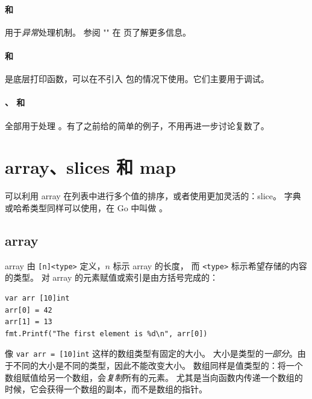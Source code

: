 \paragraph{ 和 } 用于\emph{异常}处理机制。
参阅 "" 在 \pageref{sec:panic} 页了解更多信息。

\paragraph{ 和 } 是底层打印函数，可以在不引入
 包的情况下使用。它们主要用于调试。

\paragraph{、 和 } 全部用于处理
。有了之前给的简单的例子，不用再进一步讨论复数了。


\section{array、slices 和 map}
\label{sec:arrays}
可以利用 array 在列表中进行多个值的排序，或者使用更加灵活的：slice。
字典或哈希类型同样可以使用，在 Go 中叫做 。

\subsection{array}
array 由 \verb|[n]<type>| 定义，$n$ 标示 array 的长度，
而 \verb|<type>| 标示希望存储的内容的类型。
对 array 的元素赋值或索引是由方括号完成的：
\begin{lstlisting}
var arr [10]int
arr[0] = 42
arr[1] = 13
fmt.Printf("The first element is %d\n", arr[0])
\end{lstlisting}
像 \lstinline{var arr = [10]int} 这样的数组类型有固定的大小。
大小是类型的\emph{一部分}。由于不同的大小是不同的类型，因此不能改变大小。
数组同样是值类型的：将一个数组赋值给另一个数组，会\emph{复制}所有的元素。
尤其是当向函数内传递一个数组的时候，它会获得一个数组的副本，而不是数组的指针。

